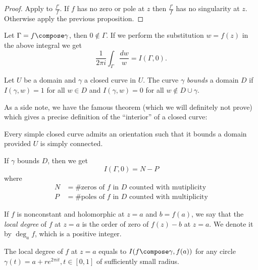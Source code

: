 \documentclass[a4paper]{article}
\begin{document}
\begin{proof}
  Apply  to \(\frac{f'}{f}\). If \(f\) has no zero or pole at \(z\) then \(\frac{f'}{f}\) has no singularity at \(z\). Otherwise apply the previous proposition.
\end{proof}

\begin{remark}
  Let \(\Gamma = f \compose \gamma\), then \(0 \notin \Gamma\). If we perform the substitution \(w = f(z)\) in the above integral we get
  \[
    \frac{1}{2\pi i} \int_\Gamma \frac{dw}{w} = I(\Gamma, 0).
  \]
\end{remark}

\begin{definition}
  Let \(U\) be a domain and \(\gamma\) a closed curve in \(U\). The curve \(\gamma\) \emph{bounds} a domain \(D\) if \(I(\gamma, w) = 1\) for all \(w \in D\) and \(I(\gamma, w) = 0\) for all \(w \notin D \cup \gamma\).
\end{definition}

As a side note, we have the famous theorem (which we will definitely not prove) which gives a precise definition of the ``interior'' of a closed curve:

\begin{theorem}
  Every simple closed curve admits an orientation such that it bounds a domain provided \(U\) is simply connected.
\end{theorem}

If \(\gamma\) bounds \(D\), then we get
\[
  I(\Gamma, 0) = N - P
\]
where
\begin{align*}
  N &= \#\text{zeros of \(f\) in \(D\) counted with mutiplicity} \\
  P &= \#\text{poles of \(f\) in \(D\) counted with multiplicity}
\end{align*}

\begin{definition}
  If \(f\) is nonconstant and holomorphic at \(z = a\) and \(b = f(a)\), we say that the \emph{local degree} of \(f\) at \(z = a\) is the order of zero of \(f(z) - b\) at \(z = a\). We denote it by \(\deg_a f\), which is a positive integer.
\end{definition}

\begin{proposition}
  The local degree of \(f\) at \(z = a\) equals to \(I(f \compose \gamma, f(a))\) for any circle \(\gamma(t) = a + re^{2\pi it}, t \in [0, 1]\) of sufficiently small radius.
\end{proposition}
\end{document}
